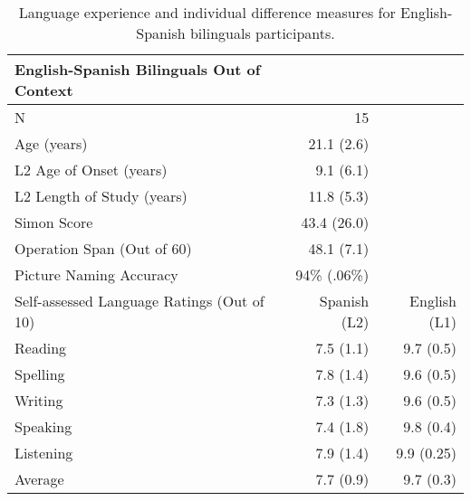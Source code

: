 \begin{table}
\begin{tabular}{ l | r   r}
English-Spanish Bilinguals Out of Context & & \\
\hline
N                           & 15&\\
Age (years)                 & 21.1 (2.6)&\\
L2 Age of Onset (years)     & 9.1 (6.1)&\\
L2 Length of Study (years)  & 11.8 (5.3)&\\
Simon Score                 & 43.4 (26.0)&\\
Operation Span (Out of 60)  & 48.1 (7.1)&\\
Picture Naming Accuracy     & 94\% (.06\%)&\\
\hline
\hline
Self-assessed Language Ratings (Out of 10) & Spanish (L2) & English (L1) \\
\hline
Reading & 7.5 (1.1) & 9.7 (0.5)\\
Spelling & 7.8 (1.4)& 9.6 (0.5)\\
Writing & 7.3 (1.3) & 9.6 (0.5)\\
Speaking & 7.4 (1.8) & 9.8 (0.4)\\
Listening & 7.9 (1.4) & 9.9 (0.25)\\
Average & 7.7 (0.9) & 9.7 (0.3)
\end{tabular}
\caption{Language experience and individual difference measures for English-Spanish bilinguals participants.}\label{es_bilinguals_experience}
\end{table}
